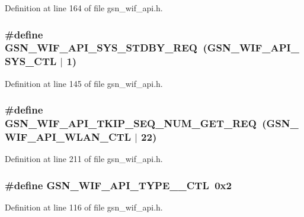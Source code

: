 Definition at line 164 of file gsn\_\-wif\_\-api.h.

\hypertarget{a00606_aac4311cb72fcfd70889bfd3a902e62c9}{
\subsubsection[{GSN\_\-WIF\_\-API\_\-SYS\_\-STDBY\_\-REQ}]{\setlength{\rightskip}{0pt plus 5cm}\#define GSN\_\-WIF\_\-API\_\-SYS\_\-STDBY\_\-REQ~(GSN\_\-WIF\_\-API\_\-SYS\_\-CTL $|$ 1)}}
\label{a00606_aac4311cb72fcfd70889bfd3a902e62c9}


Definition at line 145 of file gsn\_\-wif\_\-api.h.

\hypertarget{a00606_ac0af89f8f1a179902cd2e7a5b7a637ef}{
\subsubsection[{GSN\_\-WIF\_\-API\_\-TKIP\_\-SEQ\_\-NUM\_\-GET\_\-REQ}]{\setlength{\rightskip}{0pt plus 5cm}\#define GSN\_\-WIF\_\-API\_\-TKIP\_\-SEQ\_\-NUM\_\-GET\_\-REQ~(GSN\_\-WIF\_\-API\_\-WLAN\_\-CTL $|$ 22)}}
\label{a00606_ac0af89f8f1a179902cd2e7a5b7a637ef}


Definition at line 211 of file gsn\_\-wif\_\-api.h.

\hypertarget{a00606_a2df8a6bf01c3126db06c5aeddf23e5be}{
\subsubsection[{GSN\_\-WIF\_\-API\_\-TYPE\_\-154\_\-CTL}]{\setlength{\rightskip}{0pt plus 5cm}\#define GSN\_\-WIF\_\-API\_\-TYPE\_\_\-CTL~0x2}}
\label{a00606_a2df8a6bf01c3126db06c5aeddf23e5be}


Definition at line 116 of file gsn\_\-wif\_\-api.h.

